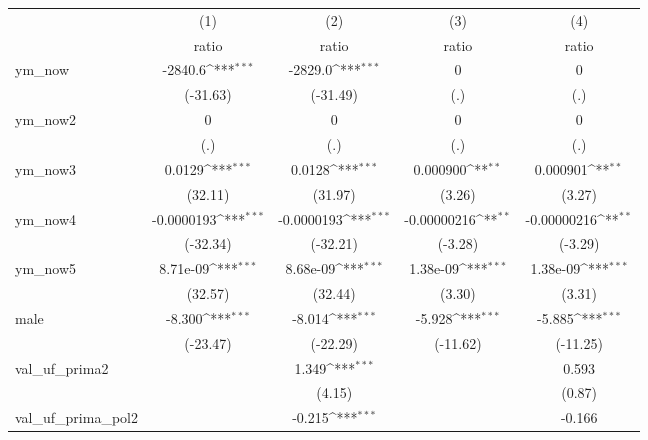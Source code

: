 {
\def\sym#1{\ifmmode^{#1}\else\(^{#1}\)\fi}
\begin{tabular}{l*{4}{c}}
\hline\hline
                    &\multicolumn{1}{c}{(1)}&\multicolumn{1}{c}{(2)}&\multicolumn{1}{c}{(3)}&\multicolumn{1}{c}{(4)}\\
                    &\multicolumn{1}{c}{ratio}&\multicolumn{1}{c}{ratio}&\multicolumn{1}{c}{ratio}&\multicolumn{1}{c}{ratio}\\
\hline
ym\_now              &     -2840.6\sym{***}&     -2829.0\sym{***}&           0         &           0         \\
                    &    (-31.63)         &    (-31.49)         &         (.)         &         (.)         \\
ym\_now2             &           0         &           0         &           0         &           0         \\
                    &         (.)         &         (.)         &         (.)         &         (.)         \\
ym\_now3             &      0.0129\sym{***}&      0.0128\sym{***}&    0.000900\sym{**} &    0.000901\sym{**} \\
                    &     (32.11)         &     (31.97)         &      (3.26)         &      (3.27)         \\
ym\_now4             &  -0.0000193\sym{***}&  -0.0000193\sym{***}& -0.00000216\sym{**} & -0.00000216\sym{**} \\
                    &    (-32.34)         &    (-32.21)         &     (-3.28)         &     (-3.29)         \\
ym\_now5             &    8.71e-09\sym{***}&    8.68e-09\sym{***}&    1.38e-09\sym{***}&    1.38e-09\sym{***}\\
                    &     (32.57)         &     (32.44)         &      (3.30)         &      (3.31)         \\
male                &      -8.300\sym{***}&      -8.014\sym{***}&      -5.928\sym{***}&      -5.885\sym{***}\\
                    &    (-23.47)         &    (-22.29)         &    (-11.62)         &    (-11.25)         \\
val\_uf\_prima2       &                     &       1.349\sym{***}&                     &       0.593         \\
                    &                     &      (4.15)         &                     &      (0.87)         \\
val\_uf\_prima\_pol2   &                     &      -0.215\sym{***}&                     &      -0.166         \\

\end{tabular}}
